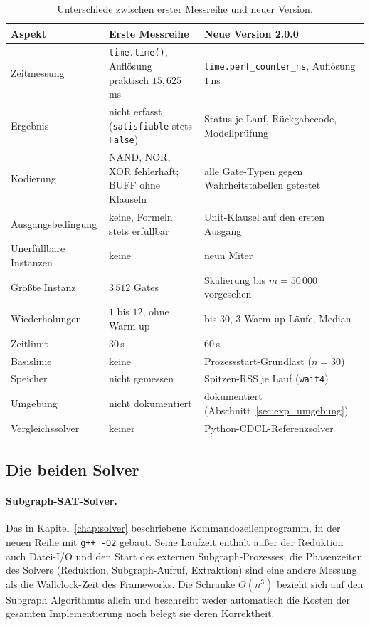 \begin{table}[!ht]
	\centering
	\small
	\begin{tabularx}{\textwidth}{@{}L{3.0cm}YY@{}}
		\toprule
		Aspekt & Erste Messreihe & Neue Version 2.0.0 \\
		\midrule
		Zeitmessung & \texttt{time.time()}, Auflösung praktisch $15{,}625$\,ms & \texttt{time.perf\_counter\_ns}, Auflösung $1$\,ns \\
		Ergebnis & nicht erfasst (\texttt{satisfiable} stets \texttt{False}) & Status je Lauf, Rückgabecode, Modellprüfung \\
		Kodierung & NAND, NOR, XOR fehlerhaft; BUFF ohne Klauseln & alle Gate-Typen gegen Wahrheitstabellen getestet \\
		Ausgangsbedingung & keine, Formeln stets erfüllbar & Unit-Klausel auf den ersten Ausgang \\
		Unerfüllbare Instanzen & keine & neun Miter \\
		Größte Instanz & $3\,512$ Gates & Skalierung bis $m=50\,000$ vorgesehen \\
		Wiederholungen & $1$ bis $12$, ohne Warm-up & bis $30$, $3$ Warm-up-Läufe, Median \\
		Zeitlimit & $30$\,s & $60$\,s \\
		Basislinie & keine & Prozessstart-Grundlast ($n=30$) \\
		Speicher & nicht gemessen & Spitzen-RSS je Lauf (\texttt{wait4}) \\
		Umgebung & nicht dokumentiert & dokumentiert (Abschnitt~\ref{sec:exp_umgebung}) \\
		Vergleichssolver & keiner & Python-CDCL-Referenzsolver \\
		\bottomrule
	\end{tabularx}
	\caption{Unterschiede zwischen erster Messreihe und neuer Version.}
	\label{tab:exp_aenderungen}
\end{table}

\subsection{Die beiden Solver}
\label{sec:exp_loeser}

\paragraph{Subgraph-SAT-Solver.} Das in Kapitel~\ref{chap:solver} beschriebene Kommandozeilenprogramm, in der neuen Reihe mit \texttt{g++ -O2} gebaut. Seine Laufzeit enthält außer der Reduktion auch Datei-I/O und den Start des externen Subgraph-Prozesses; die Phasenzeiten des Solvers (Reduktion, Subgraph-Aufruf, Extraktion) sind eine andere Messung als die Wallclock-Zeit des Frameworks. Die Schranke $\Theta(n^3)$ bezieht sich auf den Subgraph Algorithmus allein und beschreibt weder automatisch die Kosten der gesamten Implementierung noch belegt sie deren Korrektheit.

